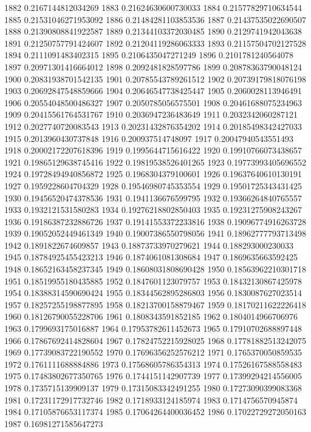 1882 0.2167144812034269
1883 0.21624630600730033
1884 0.21577829710634544
1885 0.21531046271953092
1886 0.21484281103853536
1887 0.21437535022690507
1888 0.21390808841922587
1889 0.21344103372030485
1890 0.2129741942043638
1891 0.21250757791424607
1892 0.21204119286063333
1893 0.21157504702127528
1894 0.2111091483402315
1895 0.2106435047271249
1896 0.2101781240564078
1897 0.20971301416664012
1898 0.2092481828597786
1899 0.20878363790048124
1900 0.20831938701542135
1901 0.20785543789261512
1902 0.20739179818076198
1903 0.20692847548859666
1904 0.20646547738425447
1905 0.2060028113946491
1906 0.20554048500486327
1907 0.2050785056575501
1908 0.20461688075234963
1909 0.20415561764531767
1910 0.2036947236483649
1911 0.2032342060287121
1912 0.2027740720083543
1913 0.20231432876354202
1914 0.20185498342427033
1915 0.2013960430737848
1916 0.200937514748097
1917 0.20047940543551493
1918 0.20002172207618396
1919 0.1995644715616422
1920 0.19910766073438657
1921 0.19865129638745416
1922 0.19819538526401265
1923 0.19773993405696552
1924 0.19728494940856872
1925 0.1968304379100601
1926 0.19637640610130191
1927 0.1959228604704329
1928 0.19546980745353554
1929 0.19501725343431425
1930 0.19456520474378536
1931 0.1941136676599795
1932 0.19366264840765557
1933 0.1932121531580283
1934 0.19276218802850403
1935 0.19231275908243267
1936 0.19186387232886726
1937 0.19141553372233816
1938 0.19096774916263728
1939 0.19052052449461349
1940 0.19007386550798056
1941 0.18962777793713498
1942 0.1891822674609857
1943 0.18873733970279621
1944 0.188293000230033
1945 0.18784925455423213
1946 0.1874061081308684
1947 0.1869635663592425
1948 0.18652163458237345
1949 0.18608031808690428
1950 0.18563962210301718
1951 0.18519955180435885
1952 0.1847601123079757
1953 0.18432130867425978
1954 0.18388314590690424
1955 0.18344562895286803
1956 0.1830087627023514
1957 0.18257255198877895
1958 0.18213700158879467
1959 0.18170211622226418
1960 0.18126790055228706
1961 0.1808343591852185
1962 0.1804014966706976
1963 0.1799693175016887
1964 0.17953782611452673
1965 0.17910702688897448
1966 0.17867692414828604
1967 0.17824752215928025
1968 0.17781882513242075
1969 0.17739083722190552
1970 0.17696356252576212
1971 0.1765370050859535
1972 0.1761111688884886
1973 0.17568605786354313
1974 0.17526167588558483
1975 0.17483802677350765
1976 0.1744151142907739
1977 0.17399294214556005
1978 0.1735715139909137
1979 0.17315083342491255
1980 0.17273090399083368
1981 0.17231172917732746
1982 0.1718933124185974
1983 0.1714756570945874
1984 0.17105876653117374
1985 0.17064264400036452
1986 0.17022729272050163
1987 0.16981271585647273
